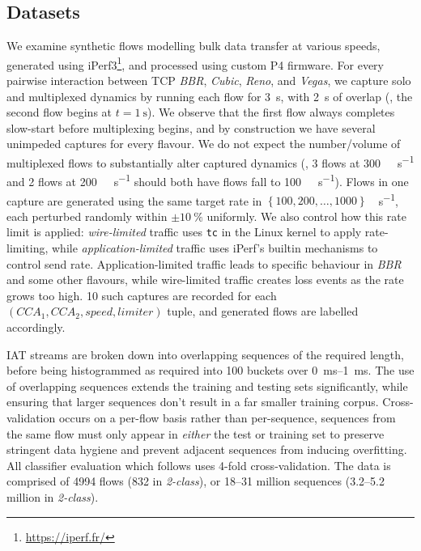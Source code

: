 \subsection{Datasets}\label{sec:seidr-datasets}
We examine synthetic flows modelling bulk data transfer at various speeds, generated using iPerf3\footnote{\url{https://iperf.fr/}}, and processed using custom P4 firmware.
For every pairwise interaction between TCP \emph{BBR}, \emph{Cubic}, \emph{Reno}, and \emph{Vegas}, we capture solo and multiplexed dynamics by running each flow for \SI{3}{\second}, with \SI{2}{\second} of overlap (\ie, the second flow begins at $t=\SI{1}{\second}$).
We observe that the first flow always completes slow-start before multiplexing begins, and by construction we have several unimpeded captures for every flavour.
We do not expect the number/volume of multiplexed flows to substantially alter captured dynamics (\ie, 3 flows at \SI{300}{\mega\bit\per\second} and 2 flows at \SI{200}{\mega\bit\per\second} should both have flows fall to \SI{100}{\mega\bit\per\second}).
Flows in one capture are generated using the same target rate in $\left\{\num{100},\num{200},\dots,\num{1000}\right\}$\si{\mega\bit\per\second}, each perturbed randomly within $\pm\SI{10}{\percent}$ uniformly.
We also control how this rate limit is applied: \emph{wire-limited} traffic uses \texttt{tc} in the Linux kernel to apply rate-limiting, while \emph{application-limited} traffic uses iPerf's builtin mechanisms to control send rate.
Application-limited traffic leads to specific behaviour in \emph{BBR} and some other flavours, while wire-limited traffic creates loss events as the rate grows too high.
\num{10} such captures are recorded for each $(\mathit{CCA}_1,\mathit{CCA}_2,\mathit{speed},\mathit{limiter})$ tuple, and generated flows are labelled accordingly.

IAT streams are broken down into overlapping sequences of the required length, before being histogrammed as required into \num{100} buckets over \SIrange{0}{1}{\milli\second}.
The use of overlapping sequences extends the training and testing sets significantly, while ensuring that larger sequences don't result in a far smaller training corpus.
Cross-validation occurs on a per-flow basis rather than per-sequence, \ie sequences from the same flow must only appear in \emph{either} the test or training set to preserve stringent data hygiene and prevent adjacent sequences from inducing overfitting.
All classifier evaluation which follows uses 4-fold cross-validation.
The data is comprised of \num{4994} flows (\num{832} in \emph{2-class}), or \numrange{18}{31} million sequences (\numrange{3.2}{5.2} million in \emph{2-class}).

